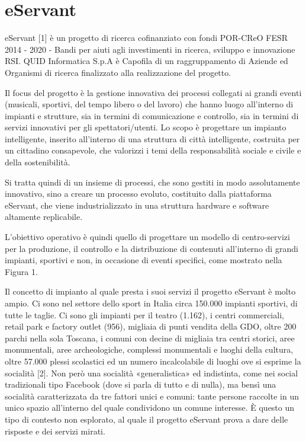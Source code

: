 \chapter{eServant}

eServant [1] è un progetto di ricerca cofinanziato con fondi POR-CReO FESR 2014 - 2020 - Bandi per aiuti agli investimenti in ricerca, sviluppo e innovazione RSI. QUID Informatica S.p.A è Capofila di un raggruppamento di Aziende ed Organismi di ricerca finalizzato alla realizzazione del progetto.

Il focus del progetto è la gestione innovativa dei processi collegati ai grandi eventi (musicali, sportivi, del tempo libero o del lavoro) che hanno luogo all’interno di impianti e strutture, sia in termini di comunicazione e controllo, sia in termini di servizi innovativi per gli spettatori/utenti. Lo scopo è progettare un impianto intelligente, inserito all’interno di una struttura di città intelligente, costruita per un cittadino consapevole, che valorizzi i temi della responsabilità sociale e civile e  della sostenibilità.

Si tratta quindi di un insieme di processi, che sono gestiti in modo assolutamente innovativo, sino a creare un processo evoluto, costituito dalla piattaforma eServant, che viene industrializzato in una struttura hardware e software altamente replicabile.

L’obiettivo operativo è quindi quello di progettare un modello di centro-servizi per la produzione, il controllo e la distribuzione di contenuti all’interno di grandi impianti, sportivi e non, in occasione di eventi specifici, come mostrato nella Figura 1.

Il concetto di impianto al quale presta i suoi servizi il progetto eServant è molto ampio.
Ci sono nel settore dello sport in Italia circa 150.000 impianti sportivi, di tutte le taglie. Ci sono gli impianti per il teatro (1.162), i centri commerciali, retail park e factory outlet (956), migliaia di punti vendita della GDO, oltre 200 parchi nella sola Toscana, i comuni con decine di migliaia tra centri storici, aree monumentali, aree archeologiche, complessi monumentali e luoghi della cultura, oltre 57.000 plessi scolastici ed un numero incalcolabile di luoghi ove si esprime la socialità [2].
Non però una socialità «generalistica» ed indistinta, come nei social tradizionali tipo Facebook (dove si parla di tutto e di nulla), ma bensì una socialità caratterizzata da tre fattori unici e comuni:
tante persone
raccolte in un unico spazio
all’interno del quale condividono un comune interesse.
È questo un tipo di contesto non esplorato, al quale il progetto eServant prova a dare delle risposte e dei servizi mirati.

